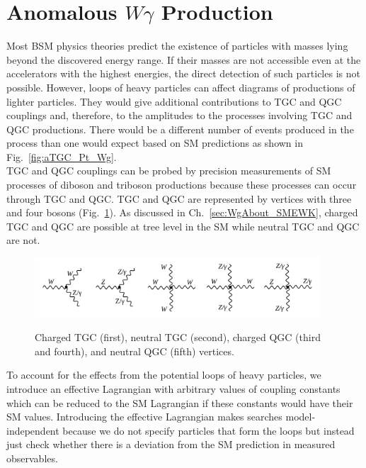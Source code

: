 \section{Anomalous $W\gamma$ Production}
\label{sec:WgAbout_ATGC}

Most BSM physics theories predict the existence of particles with masses lying beyond the discovered energy range. If their masses are not accessible even at the accelerators with the highest energies, the direct detection of such particles is not possible. However, loops of heavy particles can affect diagrams of productions of lighter particles. They would give additional contributions to TGC and QGC couplings and, therefore, to the amplitudes to the processes involving TGC and QGC productions. There would be a different number of events produced in the process than one would expect based on SM predictions as shown in Fig.~\ref{fig:aTGC_Pt_Wg}.\\

TGC and QGC couplings can be probed by precision measurements of SM processes of diboson and triboson productions because these processes can occur through TGC and QGC. TGC and QGC are represented by vertices with three and four bosons (Fig.~\ref{fig:TGC_and_QGC_vertices}). As discussed in Ch.~\ref{sec:WgAbout_SMEWK}, charged TGC and QGC are possible at tree level in the SM while neutral TGC and QGC are not.\\ 

\begin{figure}[htb]
  \begin{center}
    {\includegraphics[width=0.95\textwidth]{../figs/WgAbout/TGC_and_QGC_vertices.png}}
    \caption{Charged TGC (first), neutral TGC (second), charged QGC (third and fourth), and neutral QGC (fifth) vertices.}
    \label{fig:TGC_and_QGC_vertices}
  \end{center}
\end{figure}

To account for the effects from the potential loops of heavy particles, we introduce an effective Lagrangian with arbitrary values of coupling constants which can be reduced to the SM Lagrangian if these constants would have their SM values. Introducing the effective Lagrangian makes searches model-independent because we do not specify particles that form the loops but instead just check whether there is a deviation from the SM prediction in measured observables. \\

